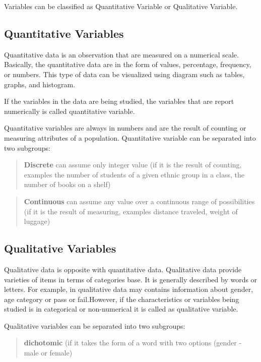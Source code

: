 \documentclass[
  a4paper,
  DIV=11,
  numbers=noendperiod,
  oneside]{scrreprt}
\begin{document}
Variables can be classified as Quantitative Variable or Qualitative
Variable.

\hypertarget{quantitative-variables}{%
\subsection{Quantitative Variables}\label{quantitative-variables}}

Quantitative data is an observation that are measured on a numerical
scale. Basically, the quantitative data are in the form of values,
percentage, frequency, or numbers. This type of data can be visualized
using diagram such as tables, graphs, and histogram.

If the variables in the data are being studied, the variables that are
report numerically is called quantitative variable.

Quantitative variables are always in numbers and are the result of
counting or measuring attributes of a population. Quantitative variable
can be separated into two subgroups:

\begin{quote}
\textbf{Discrete} can assume only integer value (if it is the result of
counting, examples the number of students of a given ethnic group in a
class, the number of books on a shelf)
\end{quote}

\begin{quote}
\textbf{Continuous} can assume any value over a continuous range of
possibilities (if it is the result of measuring, examples distance
traveled, weight of luggage)
\end{quote}

\hypertarget{qualitative-variables}{%
\subsection{Qualitative Variables}\label{qualitative-variables}}

Qualitative data is opposite with quantitative data. Qualitative data
provide varieties of items in terms of categories base. It is generally
described by words or letters. For example, in qualitative data may
contains information about gender, age category or pass or fail.However,
if the characteristics or variables being studied is in categorical or
non-numerical it is called as qualitative variable.

Qualitative variables can be separated into two subgroups:

\begin{quote}
\textbf{dichotomic} (if it takes the form of a word with two options
(gender - male or female)
\end{quote}
\end{document}
